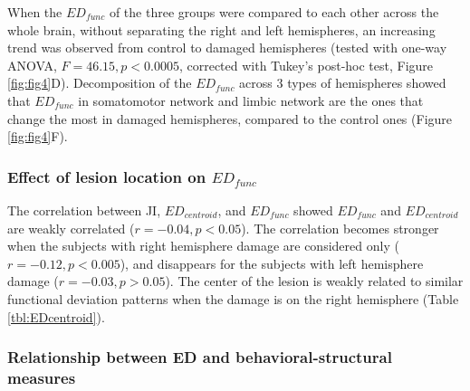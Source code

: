 \documentclass[fleqn,10pt]{wlscirep}
\begin{document}
When the $\textit{ED}_{{func}}$ of the three groups were compared to each other across the whole brain, without separating the right and left hemispheres, an increasing trend was observed from control to damaged hemispheres (tested with one-way ANOVA, $F=46.15, p < 0.0005$, corrected with Tukey's post-hoc test, Figure \ref{fig:fig4}D). Decomposition of the $\textit{ED}_{{func}}$ across 3 types of hemispheres showed that $\textit{ED}_{{func}}$ in somatomotor network and limbic network are the ones that change the most in damaged hemispheres, compared to the control ones (Figure \ref{fig:fig4}F). 



\subsubsection*{Effect of lesion location on $\textit{ED}_{{func}}$}
The correlation between JI, $\textit{ED}_{{centroid}}$, and $\textit{ED}_{{func}}$ showed $\textit{ED}_{{func}}$ and $\textit{ED}_{{centroid}}$ are weakly correlated ($ r = -0.04, p < 0.05$). The correlation becomes stronger when the subjects with right hemisphere damage are considered only ($ r = -0.12, p < 0.005$), and disappears for the subjects with left hemisphere damage ($ r = -0.03, p > 0.05$). The center of the lesion is weakly related to similar functional deviation patterns when the damage is on the right hemisphere (Table \ref{tbl:EDcentroid}). 

\subsubsection*{Relationship between ED and behavioral-structural measures}
\end{document}
